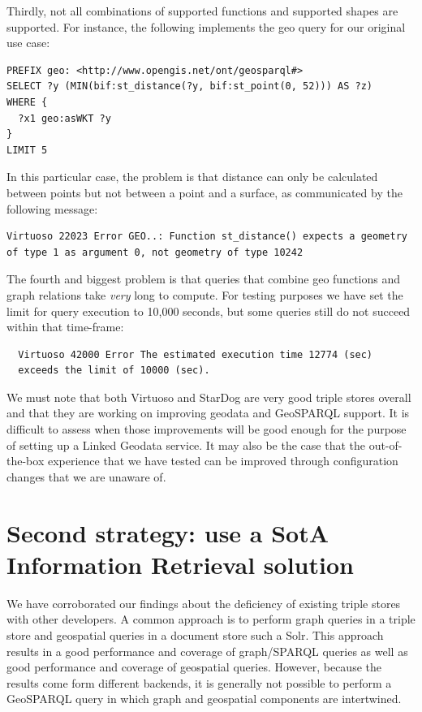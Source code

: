 \documentclass[a4paper]{scrartcl}
\begin{document}
Thirdly, not all combinations of supported functions and supported
shapes are supported.  For instance, the following implements the geo
query for our original use case:

\begin{verbatim}
PREFIX geo: <http://www.opengis.net/ont/geosparql#>
SELECT ?y (MIN(bif:st_distance(?y, bif:st_point(0, 52))) AS ?z)
WHERE {
  ?x1 geo:asWKT ?y
}
LIMIT 5
\end{verbatim}

In this particular case, the problem is that distance can only be
calculated between points but not between a point and a surface, as
communicated by the following message:

\begin{verbatim}
Virtuoso 22023 Error GEO..: Function st_distance() expects a geometry
of type 1 as argument 0, not geometry of type 10242
\end{verbatim}

The fourth and biggest problem is that queries that combine geo
functions and graph relations take \emph{very} long to compute.  For
testing purposes we have set the limit for query execution to 10,000
seconds, but some queries still do not succeed within that time-frame:

\begin{verbatim}
  Virtuoso 42000 Error The estimated execution time 12774 (sec)
  exceeds the limit of 10000 (sec).
\end{verbatim}

We must note that both Virtuoso and StarDog are very good triple
stores overall and that they are working on improving geodata and
GeoSPARQL support.  It is difficult to assess when those improvements
will be good enough for the purpose of setting up a Linked Geodata
service.  It may also be the case that the out-of-the-box experience
that we have tested can be improved through configuration changes that
we are unaware of.


\section{Second strategy: use a SotA Information Retrieval solution}

We have corroborated our findings about the deficiency of existing
triple stores with other developers.  A common approach is to perform
graph queries in a triple store and geospatial queries in a document
store such a Solr.  This approach results in a good performance and
coverage of graph/SPARQL queries as well as good performance and
coverage of geospatial queries.  However, because the results come
form different backends, it is generally not possible to perform a
GeoSPARQL query in which graph and geospatial components are
intertwined.
\end{document}
